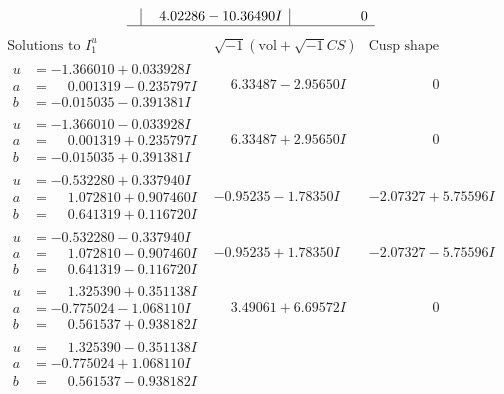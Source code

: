 \documentclass[1p]{elsarticle_modified}
\theoremstyle{definition}
\newcommand{\I}{\sqrt{-1}}
\begin{document}
$$\begin{array}{c|c|c}
 & \phantom{-}4.02286 - 10.36490 I & \phantom{-0.000000 } 0\\
 \hline 
 \end{array}$$\newpage$$\begin{array}{c|c|c}  
\text{Solutions to }I^u_{1}& \I (\text{vol} + \sqrt{-1}CS) & \text{Cusp shape}\\
 \hline 
\begin{aligned}
u &= -1.366010 + 0.033928 I \\
a &= \phantom{-}0.001319 - 0.235797 I \\
b &= -0.015035 - 0.391381 I\end{aligned}
 & \phantom{-}6.33487 - 2.95650 I & \phantom{-0.000000 } 0 \\ \hline\begin{aligned}
u &= -1.366010 - 0.033928 I \\
a &= \phantom{-}0.001319 + 0.235797 I \\
b &= -0.015035 + 0.391381 I\end{aligned}
 & \phantom{-}6.33487 + 2.95650 I & \phantom{-0.000000 } 0 \\ \hline\begin{aligned}
u &= -0.532280 + 0.337940 I \\
a &= \phantom{-}1.072810 + 0.907460 I \\
b &= \phantom{-}0.641319 + 0.116720 I\end{aligned}
 & -0.95235 - 1.78350 I & -2.07327 + 5.75596 I \\ \hline\begin{aligned}
u &= -0.532280 - 0.337940 I \\
a &= \phantom{-}1.072810 - 0.907460 I \\
b &= \phantom{-}0.641319 - 0.116720 I\end{aligned}
 & -0.95235 + 1.78350 I & -2.07327 - 5.75596 I \\ \hline\begin{aligned}
u &= \phantom{-}1.325390 + 0.351138 I \\
a &= -0.775024 - 1.068110 I \\
b &= \phantom{-}0.561537 + 0.938182 I\end{aligned}
 & \phantom{-}3.49061 + 6.69572 I & \phantom{-0.000000 } 0 \\ \hline\begin{aligned}
u &= \phantom{-}1.325390 - 0.351138 I \\
a &= -0.775024 + 1.068110 I \\
b &= \phantom{-}0.561537 - 0.938182 I\end{aligned}

\end{array}$$
\end{document}
